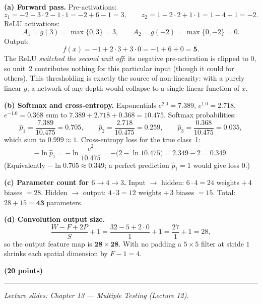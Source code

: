 \documentclass[11pt,a4paper]{article}
\newcommand{\problem}[2]{\par\vspace{7mm}\noindent{\large\textbf{Problem #1}}%
  \hfill{\large\textbf{(#2 points)}}\par\nopagebreak\vspace{0.6mm}%
  \noindent\rule{\textwidth}{0.6pt}\par\nopagebreak\vspace{2.5mm}}
\begin{document}
\ifdefined\withsolutions
\begin{solutionbox}
\textbf{(a) Forward pass.}
Pre-activations:
\[
  z_1=-2+3\cdot 2-1\cdot 1=-2+6-1=3,\qquad
  z_2=1-2\cdot 2+1\cdot 1=1-4+1=-2 .
\]
ReLU activations:
\[
  A_1=g(3)=\max\{0,3\}=3,\qquad A_2=g(-2)=\max\{0,-2\}=0 .
\]
Output:
\[
  f(x)=-1+2\cdot 3+3\cdot 0=-1+6+0=\mathbf{5}.
\]
The ReLU \emph{switched the second unit off}: its negative pre-activation is clipped to $0$, so
unit~2 contributes nothing for this particular input (though it could for others). This
thresholding is exactly the source of non-linearity: with a purely linear $g$, a network of any
depth would collapse to a single linear function of $x$.

\medskip
\textbf{(b) Softmax and cross-entropy.}
Exponentials $e^{2.0}=7.389$, $e^{1.0}=2.718$, $e^{-1.0}=0.368$ sum to
$7.389+2.718+0.368=10.475$. Softmax probabilities:
\[
  \hat{p}_1=\frac{7.389}{10.475}=0.705,\qquad
  \hat{p}_2=\frac{2.718}{10.475}=0.259,\qquad
  \hat{p}_3=\frac{0.368}{10.475}=0.035,
\]
which sum to $0.999\approx 1$. Cross-entropy loss for the true class~1:
\[
  -\ln\hat{p}_1=-\ln\frac{e^{2}}{10.475}=-\bigl(2-\ln 10.475\bigr)=2.349-2=\mathbf{0.349}.
\]
(Equivalently $-\ln 0.705\approx 0.349$; a perfect prediction $\hat{p}_1=1$ would give loss 0.)

\medskip
\textbf{(c) Parameter count for $6\to 4\to 3$.}
Input $\to$ hidden: $6\cdot 4=24$ weights $+\,4$ biases $=28$.
Hidden $\to$ output: $4\cdot 3=12$ weights $+\,3$ biases $=15$.
Total: $28+15=\mathbf{43}$ parameters.

\medskip
\textbf{(d) Convolution output size.}
\[
  \frac{W-F+2P}{S}+1=\frac{32-5+2\cdot 0}{1}+1=\frac{27}{1}+1=28,
\]
so the output feature map is $\mathbf{28\times 28}$. With no padding a $5\times 5$ filter at
stride $1$ shrinks each spatial dimension by $F-1=4$.
\end{solutionbox}
\fi

\problem{6: Multiple testing}{20}
{\small\itshape Lecture slides: Chapter 13 --- Multiple Testing (Lecture 12).}\par\vspace{1mm}
\end{document}
